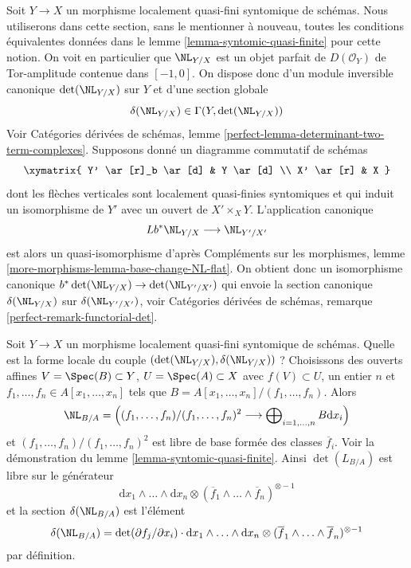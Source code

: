 \medskip\noindent
Soit $Y \to X$ un morphisme localement quasi-fini syntomique de schémas.
Nous utiliserons dans cette section, sans le mentionner à nouveau, toutes les conditions
équivalentes données dans le lemme \ref{lemma-syntomic-quasi-finite}
pour cette notion. On voit en particulier que $\NL_{Y/X}$ est un objet parfait
de $D(\mathcal{O}_Y)$ de Tor-amplitude contenue dans $[-1, 0]$. On dispose donc
d'un module inversible canonique
$\det(\NL_{Y/X})$ sur $Y$ et d'une section globale
$$
\delta(\NL_{Y/X}) \in \Gamma(Y, \det(\NL_{Y/X}))
$$
Voir Catégories dérivées de schémas, lemme
\ref{perfect-lemma-determinant-two-term-complexes}.
Supposons donné un diagramme commutatif de schémas
$$
\xymatrix{
Y' \ar[r]_b \ar[d] & Y \ar[d] \\
X' \ar[r] & X
}
$$
dont les flèches verticales sont localement quasi-finies syntomiques et qui
induit un isomorphisme de $Y'$ avec un ouvert de $X' \times_X Y$.
L'application canonique
$$
Lb^*\NL_{Y/X} \longrightarrow \NL_{Y'/X'}
$$
est alors un quasi-isomorphisme d'après
Compléments sur les morphismes, lemme \ref{more-morphisms-lemma-base-change-NL-flat}.
On obtient donc un isomorphisme canonique
$b^*\det(\NL_{Y/X}) \to \det(\NL_{Y'/X'})$ qui envoie la
section canonique $\delta(\NL_{Y/X})$ sur $\delta(\NL_{Y'/ X'})$, voir
Catégories dérivées de schémas, remarque \ref{perfect-remark-functorial-det}.

\begin{remark}
\label{remark-local-description-delta}
Soit $Y \to X$ un morphisme localement quasi-fini syntomique de schémas.
Quelle est la forme locale du couple $(\det(\NL_{Y/X}), \delta(\NL_{Y/X}))$ ?
Choisissons des ouverts affines $V = \Spec(B) \subset Y$,
$U = \Spec(A) \subset X$ avec $f(V) \subset U$, un entier $n$ et
$f_1, \ldots, f_n \in A[x_1, \ldots, x_n]$ tels que
$B = A[x_1, \ldots, x_n]/(f_1, \ldots, f_n)$. Alors
$$
\NL_{B/A} = \left(
(f_1, \ldots, f_n)/(f_1, \ldots, f_n)^2
\longrightarrow
\bigoplus\nolimits_{i = 1, \ldots, n} B \text{d} x_i\right)
$$
et $(f_1, \ldots, f_n)/(f_1, \ldots, f_n)^2$ est libre de base
formée des classes $\overline{f}_i$. Voir la démonstration du
lemme \ref{lemma-syntomic-quasi-finite}.
Ainsi $\det(L_{B/A})$ est libre sur le générateur
$$
\text{d}x_1 \wedge \ldots \wedge \text{d}x_n
\otimes
(\overline{f}_1 \wedge \ldots \wedge \overline{f}_n)^{\otimes -1}
$$
et la section $\delta(\NL_{B/A})$ est l'élément
$$
\delta(\NL_{B/A}) =
\det(\partial f_j/ \partial x_i) \cdot
\text{d}x_1 \wedge \ldots \wedge \text{d}x_n
\otimes
(\overline{f}_1 \wedge \ldots \wedge \overline{f}_n)^{\otimes -1}
$$
par définition.
\end{remark}

